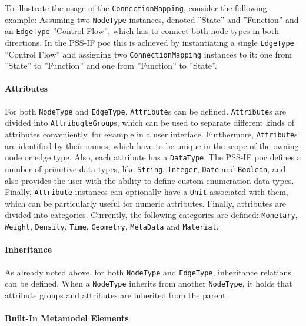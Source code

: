 To illustrate the usage of the \texttt{ConnectionMapping}, consider the following example: Assuming two \texttt{NodeType} instances, denoted ''State'' and ''Function'' and an \texttt{EdgeType} ''Control Flow'', which has to connect both node types in both directions. In the PSS-IF \gls{poc} this is achieved by instantiating a single \texttt{EdgeType} ''Control Flow'' and assigning two \texttt{ConnectionMapping} instances to it: one from ''State'' to ''Function'' and one from ''Function'' to ''State''.

\paragraph{Attributes}

For both \texttt{NodeType} and \texttt{EdgeType}, \texttt{Attribute}s can be defined. \texttt{At\-tribute}s are divided into \texttt{AttribugteGroup}s, which can be used to separate different kinds of attributes conveniently, for example in a user interface. Furthermore, \texttt{Attribute}s are identified by their names, which have to be unique in the scope of the owning node or edge type. Also, each attribute has a \texttt{DataType}. The PSS-IF \gls{poc} defines a number of primitive data types, like \texttt{String}, \texttt{Integer}, \texttt{Date} and \texttt{Boolean}, and also provides the user with the ability to define custom enumeration data types. Finally, \texttt{Attribute} instances can optionally have a \texttt{Unit} associated with them, which can be particularly useful for numeric attributes. Finally, attributes are divided into categories. Currently, the following categories are defined: \texttt{Monetary}, \texttt{Weight}, \texttt{Density}, \texttt{Time}, \texttt{Geometry}, \texttt{MetaData} and \texttt{Material}.

\paragraph{Inheritance}

As already noted above, for both \texttt{NodeType} and \texttt{EdgeType}, inheritance relations can be defined. When a \texttt{NodeType} inherits from another \texttt{NodeType}, it holds that attribute groups and attributes are inherited from the parent.

\paragraph{Built-In Metamodel Elements}

